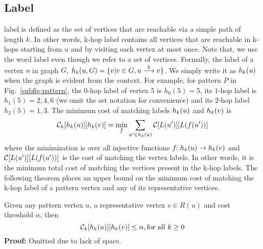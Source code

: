  \subsection{\khop Label}
 \label{sec:khop}
 \khop label is defined as the set of vertices that are reachable via a
 simple path of length $k$.  In other words, k-hop label contains all
 vertices that are reachable in k-hops starting from $u$ and by visiting
 each vertex at most once.  Note that, we use the word label even though
 we refer to a set of vertices.  Formally, the \khop label of a vertex
 $u$ in graph $G$, $\khopl{k}{u,G} = \{v | v \in G, \kpath{u}{v}{k}\}$.
 We simply write it as $\khopl{k}{u}$ when the graph is evident from the
 context.  For example, for pattern $P$ in Fig.~\ref{subfig:pattern},
 the $0$-hop label of vertex $5$ is $h_0(5) = 5$, its $1$-hop label
 is $h_1(5) = 2, 4, 6$ (we omit the set notation for
 convenience) and its $2$-hop label $h_2(5) = 1, 3$. The minimum cost of
 matching \khop labels $\khopl{k}{u}$ and $\khopl{k}{v}$ is 
 \begin{equation} 
   \label{eq:khop} 
   \khopcost{k}{u}{v} =
     \min_f \displaystyle\sum_{u' \in \khopl{k}{u}}
     \matij{\cC}{L(u')}{L(f(u'))} 
\end{equation}
where the minimization is over all injective functions
$f\!\!:\khopl{k}{u} \rightarrow \khopl{k}{v}$ and
$\matij{\cC}{L(u')}{L(f(u'))}$ is the cost of matching the vertex
labels.  In other words, it is the minimum total cost of matching the
vertices present in the k-hop labels.  The following theorem places an
upper bound on the minimum cost of matching the k-hop label of a
pattern vertex and any of its representative vertices.


\begin{thm} 
\label{thm:khop}
Given any pattern vertex $u$, a representative vertex $v \in R(u)$ and
cost threshold $\alpha$, then
$$\khopcost{k}{u}{v} \leq \alpha, \text{for all } k \geq 0$$
{\bf Proof:} Omitted due to lack of space.
%  
    \label{thm:khop}
\end{thm}

